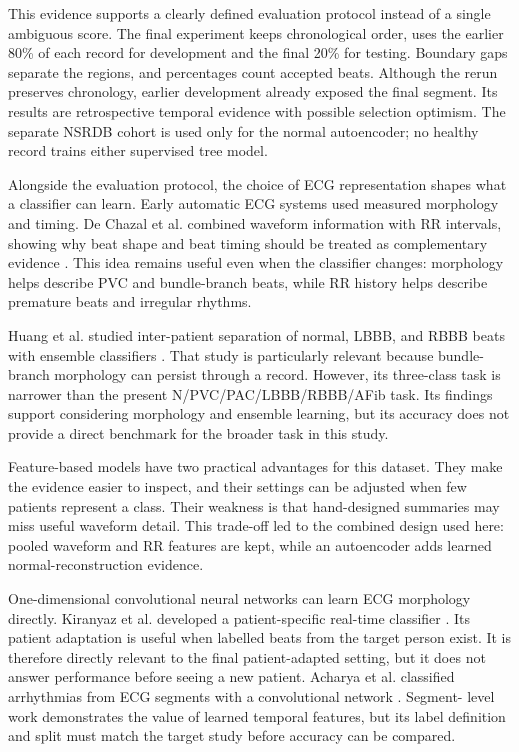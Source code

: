 This evidence supports a clearly defined evaluation protocol instead of a
single ambiguous score. The final experiment keeps chronological order, uses
the earlier 80\% of each record for development and the final 20\% for testing.
Boundary gaps separate the regions, and percentages count accepted beats. Although the rerun preserves chronology,
earlier development already exposed the final segment. Its results are
retrospective temporal evidence with possible selection optimism. The separate NSRDB
cohort is used only for the normal autoencoder; no healthy record trains either
supervised tree model.

Alongside the evaluation protocol, the choice of ECG representation shapes
what a classifier can learn. Early automatic ECG systems used measured
morphology and timing. De Chazal et
al. combined waveform information with RR intervals, showing why beat shape and
beat timing should be treated as complementary evidence
\cite{dechazal2004heartbeat}. This idea remains useful even when the classifier
changes: morphology helps describe PVC and bundle-branch beats, while RR history
helps describe premature beats and irregular rhythms.

Huang et al. studied inter-patient separation of normal, LBBB, and RBBB beats
with ensemble classifiers \cite{huang2014bbb}. That study is particularly
relevant because bundle-branch morphology can persist through a record. However,
its three-class task is narrower than the present N/PVC/PAC/LBBB/RBBB/AFib task.
Its findings support considering morphology and ensemble learning, but its
accuracy does not provide a direct benchmark for the broader task in this study.

Feature-based models have two practical advantages for this dataset. They make
the evidence easier to inspect, and their settings can be adjusted when few
patients represent a class. Their weakness is that hand-designed summaries may
miss useful waveform detail. This trade-off led to the combined design used
here: pooled waveform and RR features are kept, while an autoencoder adds
learned normal-reconstruction evidence.

One-dimensional convolutional neural networks can learn ECG morphology directly.
Kiranyaz et al. developed a patient-specific real-time classifier
\cite{kiranyaz2016ecgcnn}. Its patient adaptation is useful when labelled beats
from the target person exist. It is therefore directly relevant to the
final patient-adapted setting, but it does not answer performance before
seeing a new patient. Acharya et al. classified arrhythmias
from ECG segments with a convolutional network \cite{acharya2017cnn}. Segment-
level work demonstrates the value of learned temporal features, but its label
definition and split must match the target study before accuracy can be compared.


